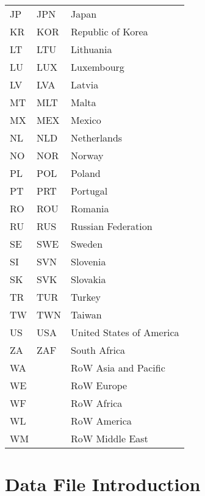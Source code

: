 \begin{appendices}
\begin{longtable}{lll}
    JP & JPN & Japan \\
    KR & KOR & Republic of Korea \\
    LT & LTU & Lithuania \\
    LU & LUX & Luxembourg \\
    LV & LVA & Latvia \\
    MT & MLT & Malta \\
    MX & MEX & Mexico \\
    NL & NLD & Netherlands \\
    NO & NOR & Norway \\
    PL & POL & Poland \\
    PT & PRT & Portugal \\
    RO & ROU & Romania \\
    RU & RUS & Russian Federation \\
    SE & SWE & Sweden \\
    SI & SVN & Slovenia \\
    SK & SVK & Slovakia \\
    TR & TUR & Turkey \\
    TW & TWN & Taiwan \\
    US & USA & United States of America \\
    ZA & ZAF & South Africa \\
    \multicolumn{2}{l}{WA} & RoW Asia and Pacific \\
    \multicolumn{2}{l}{WE} & RoW Europe \\
    \multicolumn{2}{l}{WF} & RoW Africa \\
    \multicolumn{2}{l}{WL} & RoW America \\
    \multicolumn{2}{l}{WM} & RoW Middle East \\
\end{longtable}


\section{Data File Introduction}
\label{appendixC}


\end{appendices}
